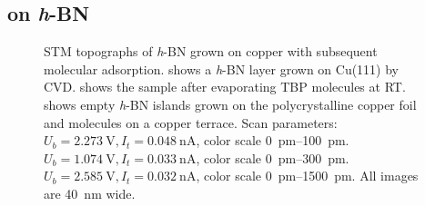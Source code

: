 	\subsection{on \textit{h}-BN}
	\label{section:TBP-on-hBN}
	\begin{figure}[] \centering
		\caption{STM topographs of \textit{h}-BN grown on copper with subsequent molecular adsorption.  shows a \textit{h}-BN layer grown on Cu(111) by CVD.  shows the sample after evaporating TBP molecules at RT.  shows empty \textit{h}-BN islands grown on the polycrystalline copper foil and molecules on a copper terrace. 
			Scan parameters:  $U_b=\SI{2.273}{\volt}, I_t=\SI{0.048}{\nano \ampere}$, color scale \SIrange{0}{100}{\pico \meter}.  $U_b=\SI{1.074}{\volt}, I_t=\SI{0.033}{\nano \ampere}$, color scale \SIrange{0}{300}{\pico \meter}.  $U_b=\SI{2.585}{\volt}, I_t=\SI{0.032}{\nano \ampere}$, color scale \SIrange{0}{1500}{\pico \meter}.  All images are \SI{40}{\nano \meter} wide.}
		\label{TBP-on-hBN}
	\end{figure}
	
